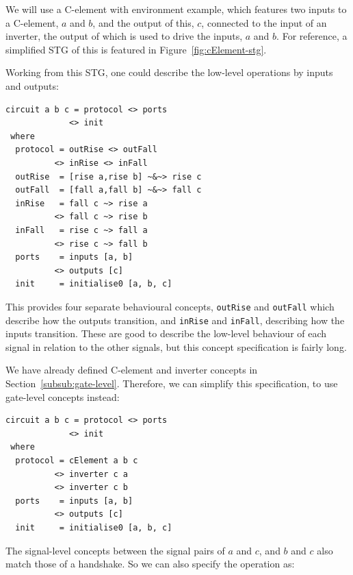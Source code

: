 \documentclass[british,conference,compsoc]{IEEEtran}
\begin{document}
We will use a C-element with environment example, which features two inputs to a C-element, $a$ and $b$, and the output
of this, $c$, connected to the input of an inverter, the output of which is used to drive the inputs, $a$ and $b$.
For reference, a simplified STG of this is featured in Figure~\ref{fig:cElement-stg}.


Working from this STG, one could describe the low-level operations by inputs and outputs:

\vspace{-1mm}

\begin{verbatim}
circuit a b c = protocol <> ports 
             <> init
 where
  protocol = outRise <> outFall 
          <> inRise <> inFall
  outRise  = [rise a,rise b] ~&~> rise c
  outFall  = [fall a,fall b] ~&~> fall c
  inRise   = fall c ~> rise a 
          <> fall c ~> rise b
  inFall   = rise c ~> fall a 
          <> rise c ~> fall b
  ports    = inputs [a, b] 
          <> outputs [c]
  init     = initialise0 [a, b, c]
\end{verbatim}


\noindent This provides four separate behavioural concepts, \texttt{outRise} and \texttt{outFall}
which describe how the outputs transition, and
\texttt{inRise} and \texttt{inFall}, describing how the inputs transition. These are good
to describe the low-level behaviour of each signal in relation to the other signals, but this concept specification
is fairly long. 

We have already defined C-element and inverter concepts
in Section~\ref{subsub:gate-level}. Therefore, we can simplify this specification, 
to use gate-level concepts instead:

\vspace{-1mm}

\begin{verbatim}
circuit a b c = protocol <> ports 
             <> init
 where
  protocol = cElement a b c 
          <> inverter c a 
          <> inverter c b
  ports    = inputs [a, b] 
          <> outputs [c]
  init     = initialise0 [a, b, c]
\end{verbatim}

The signal-level concepts between the signal pairs of $a$ and $c$, and $b$ and $c$
also match those of a handshake. So we can also specify the operation as:
\end{document}
